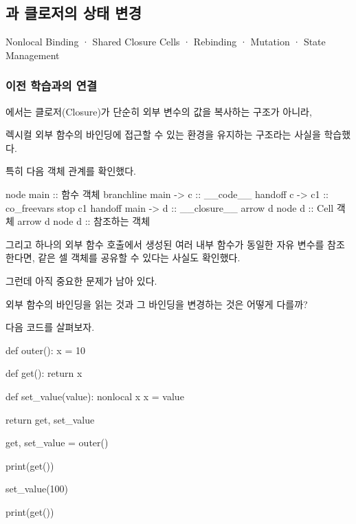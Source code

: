 

\subsection{과 클로저의 상태 변경}

Nonlocal Binding · Shared Closure Cells · Rebinding · Mutation · State Management

\subsubsection{이전 학습과의 연결}

에서는 클로저(Closure)가 단순히 외부 변수의 값을 복사하는 구조가 아니라, 

렉시컬 외부 함수의 바인딩에 접근할 수 있는 환경을 유지하는 구조라는 사실을 학습했다.

특히 다음 객체 관계를 확인했다.

\begin{dhkbranch}[in=8]
node main :: 함수 객체
branchline main -> c :: __code__
handoff c -> c1 :: co_freevars
stop c1
handoff main -> d :: __closure__
arrow d
node d :: Cell 객체
arrow d
node d :: 참조하는 객체
\end{dhkbranch}

그리고 하나의 외부 함수 호출에서 생성된 여러 내부 함수가 동일한 자유 변수를 참조한다면, 같은 셀 객체를 공유할 수 있다는 사실도 확인했다.

그런데 아직 중요한 문제가 남아 있다.

외부 함수의 바인딩을 읽는 것과 그 바인딩을 변경하는 것은 어떻게 다를까?

다음 코드를 살펴보자.

\begin{dhkcode}
def outer():
    x = 10

    def get():
        return x

    def set_value(value):
        nonlocal x
        x = value

    return get, set_value


get, set_value = outer()

print(get())

set_value(100)

print(get())
\end{dhkcode}

